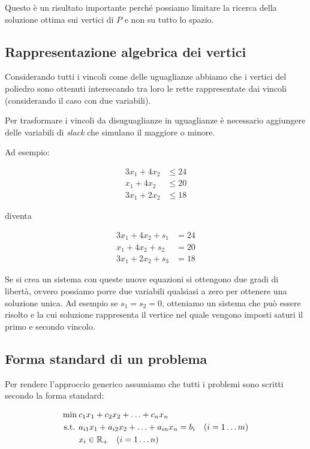 Questo è un risultato importante perché possiamo limitare la ricerca della soluzione ottima sui vertici di $P$ e non su tutto lo spazio.

\subsection{Rappresentazione algebrica dei vertici}

Considerando tutti i vincoli come delle uguaglianze abbiamo che i vertici del poliedro sono ottenuti intersecando tra loro le rette rappresentate dai vincoli (considerando il caso con due variabili).

Per trasformare i vincoli da disuguaglianze in uguaglianze è necessario aggiungere delle variabili di \textit{slack} che simulano il maggiore o minore.

Ad esempio:

	\begin{align*}
	3x_1 + 4x_2 &\leq 24 \\
	x_1 + 4x_2 &\leq 20 \\
	3x_1 + 2x_2 &\leq 18
	\end{align*}


\noindent diventa



	\begin{align*}
	3x_1 + 4x_2 +s_1&= 24 \\
	x_1 + 4x_2 +s_2&= 20 \\
	3x_1 + 2x_2 +s_3&= 18
	\end{align*}



Se si crea un sistema con queste nuove equazioni si ottengono due gradi di libertà, ovvero possiamo porre due variabili qualsiasi a zero per ottenere una soluzione unica.
Ad esempio se $s_1 = s_2=0$, otteniamo un sistema che può essere risolto e la cui soluzione rappresenta il vertice nel quale vengono imposti saturi il primo e secondo vincolo.

\subsection{Forma standard di un problema}

Per rendere l'approccio generico assumiamo che tutti i problemi sono scritti secondo la forma standard:

\begin{align*}
\min \: &c_1x_1+ c_2x_2 +\ldots + c_nx_n \\
\text{s.t. } &a_{i1}x_1 + a_{i2}x_2 +\ldots+a_{in}x_n = b_i \quad (i = 1 \ldots m) \\
&x_i \in \mathbb{R}_+ \quad (i = 1 \ldots n)
\end{align*}

